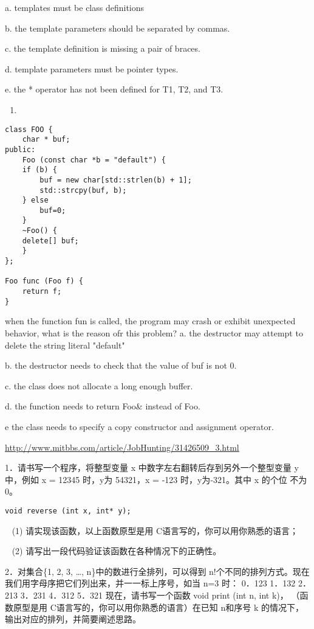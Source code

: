 \documentclass[12pt]{book}
\begin{document}
a. templates must be class definitions

b. the template parameters should be separated by commas.

c. the template definition is missing a pair of braces.

d. template parameters must be pointer types.

e. the * operator has not been defined for T1, T2, and T3.

\begin{enumerate}
\item 
\end{enumerate}
\lstset{language=java,label= ,caption= ,numbers=none}
\begin{lstlisting}
class FOO {
    char * buf;
public:
    Foo (const char *b = "default") {
	if (b) {
	    buf = new char[std::strlen(b) + 1];
	    std::strcpy(buf, b);
	} else         
	    buf=0;
    }
    ~Foo() {
	delete[] buf;
    }
};

Foo func (Foo f) {
    return f;
}
\end{lstlisting}
when the function fun is called, the program may crash or exhibit
unexpected behavior, what is the reason ofr this problem?
a. the destructor may attempt to delete the string literal "default"

b. the destructor needs to check that the value of buf is not 0.

c. the class does not allocate a long enough buffer.

d. the function needs to return Foo\& instead of Foo.

e  the class needs to specify a copy constructor and assignment operator.

\url{http://www.mitbbs.com/article/JobHunting/31426509_3.html}

1．请书写一个程序，将整型变量 x 中数字左右翻转后存到另外一个整型变量 y
中，例如 x = 12345 时，y为 54321，x = ‐123 时，y为‐321。其中 x 的个位
不为 0。   
\lstset{language=java,label= ,caption= ,numbers=none}
\begin{lstlisting}
void reverse (int x, int* y);
\end{lstlisting}
~ (1)  请实现该函数，以上函数原型是用 C语言写的，你可以用你熟悉的语言； 

~ (2)  请写出一段代码验证该函数在各种情况下的正确性。 

2．对集合\{1, 2, 3, …, n\}中的数进行全排列，可以得到 n!个不同的排列方式。现在我们用字母序把它们列出来，并一一标上序号，如当 n=3 时：  0．123   1．132   2．213   3．231   4．312   5．321 现在，请书写一个函数 void print (int n, int k)， （函数原型是用 C语言写的，你可以用你熟悉的语言）在已知 n和序号 k 的情况下，输出对应的排列，并简要阐述思路。 
\end{document}
